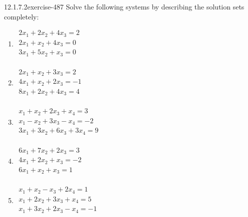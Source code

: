 \documentclass[twoside,10pt,]{book}
\numberwithin{equation}{section}
\begin{document}
\begin{divisionsolution}{12.1.7.2}{}{exercise-487}%
\hypertarget{p-4387}{}%
Solve the following systems by describing the solution sets completely:\leavevmode%
\begin{multicols}{2}
\begin{enumerate}[label=(\alph*)]
\item\hypertarget{li-2008}{}\hypertarget{p-4388}{}%
\(\begin{array}{l}
2 x_1+2 x_2+4 x_3=2 \\
2 x_1+x_2+4 x_3=0 \\
3 x_1+5 x_2+x_3=0 \\
\end{array}\)%
\item\hypertarget{li-2009}{}\hypertarget{p-4389}{}%
\(\begin{array}{l}
2 x_1+x_2+3 x_3=2 \\
4 x_1+x_2+2 x_3=-1 \\
8 x_1+2 x_2+4 x_3=4 \\
\end{array}\)%
\item\hypertarget{li-2010}{}\hypertarget{p-4390}{}%
\(\begin{array}{l}
x_1+x_2+2 x_3+x_4=3 \\
x_1-x_2+3 x_3-x_4=-2 \\
3 x_1+3 x_2+6 x_3+3 x_4=9 \\
\end{array}\)%
\item\hypertarget{li-2011}{}\hypertarget{p-4391}{}%
\(\begin{array}{l}
6 x_1+7 x_2+2 x_3=3 \\
4 x_1+2 x_2+x_3=-2 \\
6 x_1+x_2+x_3=1 \\
\end{array}\)%
\item\hypertarget{li-2012}{}\hypertarget{p-4392}{}%
\(\begin{array}{l}
x_1+x_2-x_3+2 x_4=1 \\
x_1+2 x_2+3 x_3+x_4=5 \\
x_1+3 x_2+2 x_3-x_4=-1 \\
\end{array}\)%
\end{enumerate}
\end{multicols}
%
\end{divisionsolution}%
\end{document}
